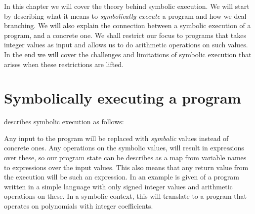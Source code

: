 In this chapter we will cover the theory behind symbolic execution. We will start by describing what it means to \emph{symbolically execute} a program and how we deal branching. We will also explain the connection between a symbolic execution of a program, and a concrete one. We shall restrict our focus to programs that takes integer values as input and allows us to do arithmetic operations on such values. In the end we will cover the challenges and limitations of symbolic execution that arises when these restrictions are lifted. 
\iffalse 	
\section{Principles of symbolic execution }
	
	In \cite{king76}, symbolic execution is described as a practical approach between simple program testing and program proving. At one extreme, program testing allows the programmer to get some level of confidence in the program, by running it on a well-selected sample of input values, but this sample size will be but a fraction of the possible input values. At the other extreme, program proving will give complete confidence in the programs correctness. To achieve this, one must provide a precise specification of correct behavior, as well as be able to perform perform formal proof steps to conclude that the program satisfies this specification. This is a challenging task, even for relatively simple programs. \emph{Symbolic execution} will serve as a practical middle ground between these two, in which we try to extend simple program testing to cover more general classes of inputs.  
\fi

\section{Symbolically executing a program}
	
	
	
	\iffalse
	\cite{CadarSen13} describes symbolic execution as follows:
	
	Any input to the program will be replaced with \emph{symbolic} values instead of concrete ones. Any operations on the symbolic values, will result in expressions over these, so our program state can be describes as a map from variable names to expressions over the input values. This also means that any return value from the execution will be such an expression. In \cite{king76} an example is given of a program written in a simple language with only signed integer values and arithmetic operations on these. In a symbolic context, this will translate to a program that operates on polynomials with integer coefficients.
	
